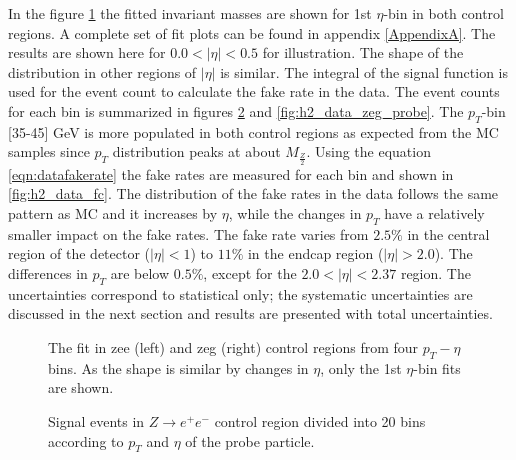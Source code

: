 In the figure \ref{fig:fit_log} the fitted invariant masses are shown for 1st $\eta$-bin in both control regions. A complete set of fit plots can be found in appendix \ref{AppendixA}. The results are shown here for $0.0<|\eta|<0.5$ for illustration. The shape of the distribution in other regions of $|\eta|$ is similar. The integral of the signal function is used for the event count to calculate the fake rate in the data. The event counts for each bin is summarized in figures \ref{fig:h2_data_zee_probe} and \ref{fig:h2_data_zeg_probe}. The $p_{T}$-bin [35-45] GeV is more populated in both control regions as expected from the MC samples since $p_{T}$ distribution peaks at about $M_{\frac{Z}{2}}$.
Using the equation \ref{eqn:datafakerate} the fake rates are measured for each bin and shown in \ref{fig:h2_data_fc}. The distribution of the fake rates in the data follows the same pattern as MC and it increases by $\eta$, while the changes in $p_{T}$ have a relatively smaller impact on the fake rates. The fake rate varies from $2.5\%$ in the central region of the detector ($|\eta|<1$) to $11\%$ in the endcap region ($|\eta|>2.0$). The differences in $p_{T}$ are below $0.5\%$, except for the $2.0<|\eta|<2.37$ region. The uncertainties correspond to statistical only; the systematic uncertainties are discussed in the next section and results are presented with total uncertainties.

\begin{figure}[H]
\begin{center}
\scalebox{0.35}{}\scalebox{0.35}{}
\scalebox{0.35}{}\scalebox{0.35}{}
\scalebox{0.35}{}\scalebox{0.35}{}
\scalebox{0.35}{}\scalebox{0.35}{}
\caption{The fit in zee (left) and zeg (right) control regions from four $p_{T}-\eta$ bins. As the shape is similar by changes in $\eta$, only the 1st $\eta$-bin fits are shown.}
\label{fig:fit_log}
\end{center}
\end{figure}

\begin{figure}[H]
\begin{center}
\scalebox{0.6}{}
\caption{Signal events in $Z \rightarrow e^{+}e^{-}$ control region divided into 20 bins according to $p_{T}$ and $\eta$ of the probe particle.}
\label{fig:h2_data_zee_probe}
\end{center}
\end{figure}

